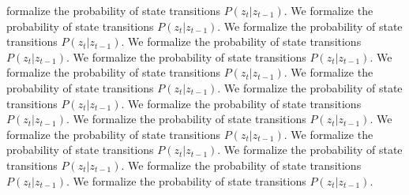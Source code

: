 formalize the probability of state transitions $P(z_t | z_{t-1})$. We formalize the probability of state transitions $P(z_t | z_{t-1})$. We formalize the probability of state transitions $P(z_t | z_{t-1})$. We formalize the probability of state transitions $P(z_t | z_{t-1})$. We formalize the probability of state transitions $P(z_t | z_{t-1})$. We formalize the probability of state transitions $P(z_t | z_{t-1})$. We formalize the probability of state transitions $P(z_t | z_{t-1})$. We formalize the probability of state transitions $P(z_t | z_{t-1})$. We formalize the probability of state transitions $P(z_t | z_{t-1})$. We formalize the probability of state transitions $P(z_t | z_{t-1})$. We formalize the probability of state transitions $P(z_t | z_{t-1})$. We formalize the probability of state transitions $P(z_t | z_{t-1})$. We formalize the probability of state transitions $P(z_t | z_{t-1})$. We formalize the probability of state transitions $P(z_t | z_{t-1})$. We formalize the probability of state transitions $P(z_t | z_{t-1})$. 

